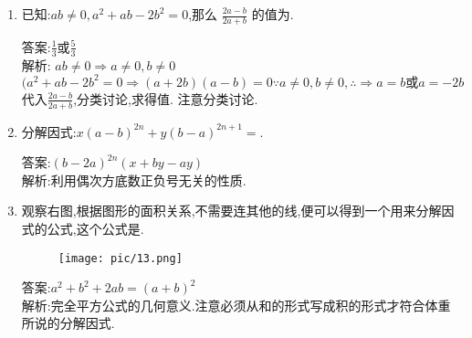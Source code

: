 \documentclass[cn,blue]{elegantbook}
\begin{document}
\begin{enumerate}
    \item 已知:\(ab \ne 0,a^2 + ab - 2b^2 = 0\),那么 \(\frac{2a-b}{2a+b}\) 的值为\tkt{\qquad}.
\begin{solution}
    答案:\(\frac{1}{3}\text{或}\frac{5}{3}\)\\
    解析: \(ab \ne 0 \Rightarrow a\ne 0,b\ne 0\)\\
    \((a^2+ab-2b^2=0 \Rightarrow (a+2b)(a-b)=0 \because a\ne 0,b\ne 0,\therefore \Rightarrow a=b\text{或}a=-2b\)\\
    代入\(\frac{2a-b}{2a+b}\),分类讨论,求得值.
    注意分类讨论.
\end{solution}
    \item 分解因式:\(x(a - b)^{2n} + y(b - a)^{2n+1} =\)\tkt{\qquad}.
\begin{solution}
    答案:\((b-2a)^{2n}(x+by-ay)\)\\
    解析:利用偶次方底数正负号无关的性质.
\end{solution}
    \item 观察右图,根据图形的面积关系,不需要连其他的线,便可以得到一个用来分解因式的公式,这个公式是.
        \begin{figure}[H]
        \begin{center}
            \texttt{[image: pic/13.png]}
        \end{center}
        \end{figure}
\begin{solution}
    答案:\(a^2 +b^2+2ab=(a+b)^2\)\\
    解析:完全平方公式的几何意义.注意必须从和的形式写成积的形式才符合体重所说的分解因式.\\
\end{solution}
        

\end{enumerate}
\end{document}
